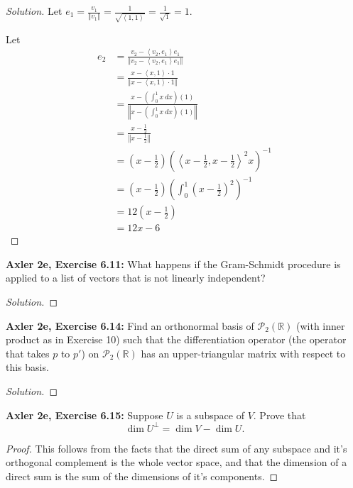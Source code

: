 \documentclass{article}
\newcommand{\R}{\mathbb{R}}
\newcommand{\paren}[1]{\left( #1 \right)}
\newcommand{\norm}[1]{\left\Vert #1 \right\Vert}
\newcommand{\iprod}[2]{\left\langle #1, #2 \right\rangle}
\begin{document}
\begin{proof}[Solution]
    Let $e_1 = \frac{v_1}{\norm{v_1}} = \frac{1}{\sqrt{\iprod{1}{1}}} = \frac{1}{\sqrt{1}} = 1$. 

    Let \begin{align*}
        e_2 &= \frac{v_2 - \iprod{v_2}{e_1}e_1}{\norm{v_2 - \iprod{v_2}{e_1}e_1}} \\
        &= \frac{x - \iprod{x}{1}\cdot 1}{\norm{x - \iprod{x}{1} \cdot 1}} \\
        &= \frac{x - \paren{\int_0^1 x \: dx}(1)}{\norm{x - \paren{\int_0^1 x \: dx}(1)}} \\
        &= \frac{x - \frac{1}{2}}{\norm{x - \frac{1}{2}}} \\
        &= \paren{x - \frac{1}{2}}\paren{\iprod{x - \frac{1}{2}}{x - \frac{1}{2}}^2x}^{-1} \\
        &= \paren{x - \frac{1}{2}}\paren{\int_0^1 \paren{x - \frac{1}{2}}^2}^{-1} \\
        &= 12\paren{x - \frac{1}{2}} \\
        &= 12x - 6
    \end{align*}

    
\end{proof}

\newpage %

\textbf{Axler 2e, Exercise 6.11: }
What happens if the Gram-Schmidt procedure is applied to a list of vectors that is not linearly independent?

\begin{proof}[Solution]
    
\end{proof}


\newpage %


\textbf{Axler 2e, Exercise 6.14: }
Find an orthonormal basis of $\mathcal{P}_2(\R)$ (with inner product as in Exercise 10) such that the differentiation operator (the operator that takes $p$ to $p'$) on $\mathcal{P}_2(\R)$ has an upper-triangular matrix with respect to this basis.

\begin{proof}[Solution]
    
\end{proof}


\newpage %


\textbf{Axler 2e, Exercise 6.15: } %
Suppose $U$ is a subspace of $V$. Prove that
$$\dim U^\perp = \dim V - \dim U.$$

\begin{proof}


    This follows from the facts that the direct sum of any subspace and it's orthogonal complement is the whole vector space, and that the dimension of a direct sum is the sum of the dimensions of it's components.    
\end{proof}
\end{document}
